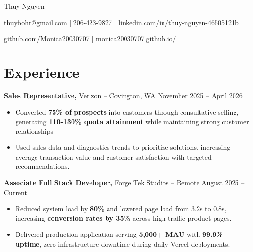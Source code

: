 \documentclass[11pt]{article}       %
\begin{document}
\centerline{\Huge Thuy Nguyen}

\vspace{5pt}

\centerline{\href{mailto:thuybohr@gmail.com}{thuybohr@gmail.com} | 206-423-9827 |
\href{https://www.linkedin.com/in/thuy-nguyen-46505121b/}{linkedin.com/in/thuy-nguyen-46505121b}}

\centerline{\href{https://github.com/Monica20030707}{github.com/Monica20030707} | 
\href{https://monica20030707.github.io/}{monica20030707.github.io/}} 

\vspace{-9pt}

\section*{Experience}

\textbf{Sales Representative,} {Verizon} -- Covington, WA \hfill November 2025 -- April 2026 \\
\vspace{-9pt}
\begin{itemize}
  \item Converted \textbf{75\% of prospects} into customers through consultative selling, generating \textbf{110-130\% quota attainment} while maintaining strong customer relationships.
  \item Used sales data and diagnostics trends to prioritize solutions, increasing average transaction value and customer satisfaction with targeted recommendations.
\end{itemize}

\textbf{Associate Full Stack Developer,} {Forge Tek Studios} -- Remote \hfill August 2025 -- Current 
\vspace{-9pt}
\begin{itemize}
  \item Reduced system load by \textbf{80\%} and lowered page load from 3.2s to 0.8s, increasing \textbf{conversion rates by 35\%} across high-traffic product pages.
  \item Delivered production application serving \textbf{5,000+ MAU} with \textbf{99.9\% uptime}, zero infrastructure downtime during daily Vercel deployments.
\end{itemize}
\end{document}
